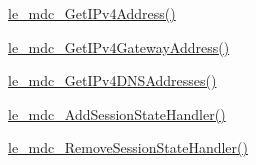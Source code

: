 \begin{DoxyItemize}
\item \hyperlink{le__mdc__interface_8h_a0b5e11efda06472fc6c525101fceafe6}{le\+\_\+mdc\+\_\+\+Get\+I\+Pv4\+Address()}
\item \hyperlink{le__mdc__interface_8h_a290cff563b19ee4891bcd5c8908c54f9}{le\+\_\+mdc\+\_\+\+Get\+I\+Pv4\+Gateway\+Address()}
\item \hyperlink{le__mdc__interface_8h_a0dd0dcf60d647388fa3e1973917a6161}{le\+\_\+mdc\+\_\+\+Get\+I\+Pv4\+D\+N\+S\+Addresses()}
\item \hyperlink{le__mdc__interface_8h_a594c85c1ccb56ddfbaf36496f35f681e}{le\+\_\+mdc\+\_\+\+Add\+Session\+State\+Handler()}
\item \hyperlink{le__mdc__interface_8h_af223a193b73ce6f870947557f69136dc}{le\+\_\+mdc\+\_\+\+Remove\+Session\+State\+Handler()}
\end{DoxyItemize}


